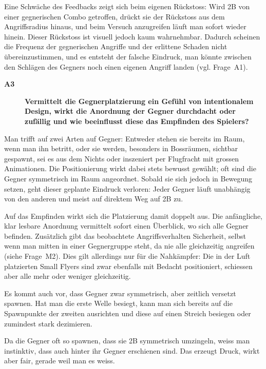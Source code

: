 \documentclass[../Main.tex]{subfiles}
\begin{document}
Eine Schwäche des Feedbacks zeigt sich beim eigenen Rückstoss: Wird 2B von einer gegnerischen Combo getroffen, drückt sie der Rückstoss aus dem Angriffsradius hinaus, und beim Versuch anzugreifen läuft man sofort wieder hinein. Dieser Rückstoss ist visuell jedoch kaum wahrnehmbar. Dadurch scheinen die Frequenz der gegnerischen Angriffe und der erlittene Schaden nicht übereinzustimmen, und es entsteht der falsche Eindruck, man könnte zwischen den Schlägen des Gegners noch einen eigenen Angriff landen (vgl. Frage~A1).

\begin{description}
    \item[\textbf{A3}] \textbf{Vermittelt die Gegnerplatzierung ein Gefühl von intentionalem Design, wirkt die Anordnung der Gegner durchdacht oder zufällig und wie beeinflusst diese das Empfinden des Spielers?}
\end{description}

Man trifft auf zwei Arten auf Gegner: Entweder stehen sie bereits im Raum, wenn man ihn betritt, oder sie werden, besonders in Bossräumen, sichtbar gespawnt, sei es aus dem Nichts oder inszeniert per Flugfracht mit grossen Animationen. Die Positionierung wirkt dabei stets bewusst gewählt; oft sind die Gegner symmetrisch im Raum angeordnet. Sobald sie sich jedoch in Bewegung setzen, geht dieser geplante Eindruck verloren: Jeder Gegner läuft unabhängig von den anderen und meist auf direktem Weg auf 2B zu.

Auf das Empfinden wirkt sich die Platzierung damit doppelt aus. Die anfängliche, klar lesbare Anordnung vermittelt sofort einen Überblick, wo sich alle Gegner befinden. Zusätzlich gibt das beobachtete Angriffsverhalten Sicherheit, selbst wenn man mitten in einer Gegnergruppe steht, da nie alle gleichzeitig angreifen (siehe Frage~M2). Dies gilt allerdings nur für die Nahkämpfer: Die in der Luft platzierten Small Flyers sind zwar ebenfalls mit Bedacht positioniert, schiessen aber alle mehr oder weniger gleichzeitig.

Es kommt auch vor, dass Gegner zwar symmetrisch, aber zeitlich versetzt spawnen. Hat man die erste Welle besiegt, kann man sich bereits auf die Spawnpunkte der zweiten ausrichten und diese auf einen Streich besiegen oder zumindest stark dezimieren.

Da die Gegner oft so spawnen, dass sie 2B symmetrisch umzingeln, weiss man instinktiv, dass auch hinter ihr Gegner erschienen sind. Das erzeugt Druck, wirkt aber fair, gerade weil man es weiss.
\end{document}
